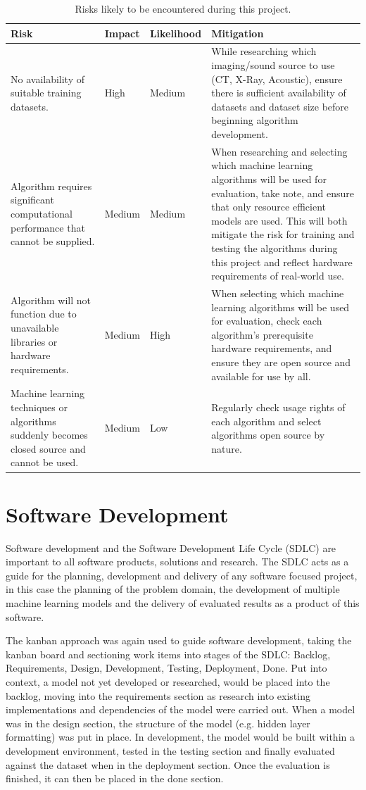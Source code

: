 \begin{table}[H]
    \caption{Risks likely to be encountered during this project.}
    \centering
    \begin{tabular}{p{}|p{}|p{}|p{}}
    Risk & Impact & Likelihood & Mitigation\\
    \hline\hline
    No availability of suitable training datasets. & High & Medium & While researching which imaging/sound source to use (CT, X-Ray, Acoustic), ensure there is sufficient availability of datasets and dataset size before beginning algorithm development.\\
    Algorithm requires significant computational performance that cannot be supplied. & Medium & Medium & When researching and selecting which machine learning algorithms will be used for evaluation, take note, and ensure that only resource efficient models are used. This will both mitigate the risk for training and testing the algorithms during this project and reflect hardware requirements of real-world use.\\
    Algorithm will not function due to   unavailable libraries or hardware requirements. & Medium & High & When selecting which machine learning algorithms will be used for evaluation, check each algorithm’s prerequisite hardware requirements, and ensure they are open source and available for use by all.\\
    Machine learning techniques or algorithms suddenly becomes closed source and cannot be used. & Medium & Low & Regularly check usage rights of each algorithm and select algorithms open source by nature.\\ 
    \end{tabular}
    \label{tbl:risk-table}
\end{table}

\section{Software Development}
Software development and the Software Development Life Cycle (SDLC) are important to all software products, solutions and research. The SDLC acts as a guide for the planning, development and delivery of any software focused project, in this case the planning of the problem domain, the development of multiple machine learning models and the delivery of evaluated results as a product of this software.

The kanban approach was again used to guide software development, taking the kanban board and sectioning work items into stages of the SDLC: Backlog, Requirements, Design, Development, Testing, Deployment, Done. Put into context, a model not yet developed or researched, would be placed into the backlog, moving into the requirements section as research into existing implementations and dependencies of the model were carried out. When a model was in the design section, the structure of the model (e.g. hidden layer formatting) was put in place. In development, the model would be built within a development environment, tested in the testing section and finally evaluated against the dataset when in the deployment section. Once the evaluation is finished, it can then be placed in the done section.

